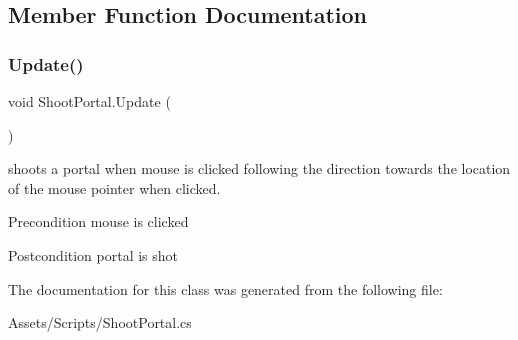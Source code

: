 \subsection{Member Function Documentation}
\mbox{\label{class_shoot_portal_a1160266ce719d6b93655286e0909bae8}} 
\subsubsection{\texorpdfstring{Update()}{Update()}}
{\footnotesize\ttfamily void Shoot\+Portal.\+Update (\begin{DoxyParamCaption}{ }\end{DoxyParamCaption})\hspace{0.3cm}{\ttfamily [inline]}}

shoots a portal when mouse is clicked following the direction towards the location of the mouse pointer when clicked. \begin{DoxyPrecond}{Precondition}
mouse is clicked 
\end{DoxyPrecond}
\begin{DoxyPostcond}{Postcondition}
portal is shot 
\end{DoxyPostcond}


The documentation for this class was generated from the following file\+:\begin{DoxyCompactItemize}
\item 
Assets/\+Scripts/Shoot\+Portal.\+cs\end{DoxyCompactItemize}
